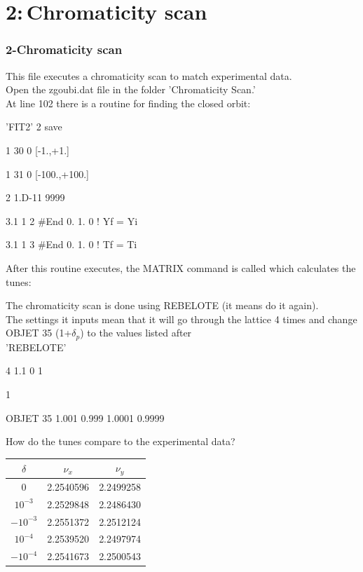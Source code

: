 \documentclass{beamer}
\begin{document}
\section{2:\,Chromaticity scan}
\begin{frame}
\frametitle{2-Chromaticity scan}
This file executes a chromaticity scan to match experimental data.\\
Open the zgoubi.dat file in the folder 'Chromaticity Scan.'\\
At line 102 there is a routine for finding the closed orbit:
\tiny

 'FIT2'
2  save

1 30 0 [-1.,+1.]

1 31 0 [-100.,+100.]

2  1.D-11  9999

3.1  1  2  \#End 0. 1. 0   ! Yf = Yi

3.1  1  3  \#End 0. 1. 0   ! Tf = Ti

\normalsize
After this routine executes, the MATRIX command is called which calculates the tunes:
\end{frame}
\begin{frame}
The chromaticity scan is done using REBELOTE (it means do it again). \\
The settings it inputs mean that it will go through the lattice 4 times and change OBJET 35 (1+$\delta_p$) to the values listed after\\
\tiny
 'REBELOTE'

4 1.1 0 1

1

OBJET 35  1.001  0.999  1.0001  0.9999

\normalsize
How do the tunes compare to the experimental data?\\

\begin{tabular}{ccc}
$\delta$  &$\nu_x$  &$\nu_y$\\
\hline
0		  &2.2540596&2.2499258\\
$10^{-3}$ &2.2529848&2.2486430\\
$-10^{-3}$&2.2551372&2.2512124\\
$10^{-4}$ &2.2539520&2.2497974\\
$-10^{-4}$&2.2541673&2.2500543\\
\end{tabular}
\end{frame}
\end{document}
